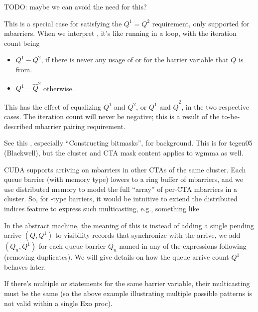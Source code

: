 \filbreak
{}

TODO: maybe we can avoid the need for this?

This is a special case for satisfying the $Q^1 = Q^2$ requirement, only supported for mbarriers.
When we interpret , it's like running
 in a loop, with the iteration count being
\begin{itemize}
  \item $Q^1 - Q^2$, if there is never any usage of  or  for the barrier variable that $Q$ is from.
  \item $Q^1 - \widehat{Q}^2$ otherwise.
\end{itemize}
This has the effect of equalizing $Q^1$ and $Q^2$, or $Q^1$ and $\widehat{Q}^2$, in the two respective cases.
The iteration count will never be negative; this is a result of the to-be-described mbarrier pairing requirement.

\newpage
{}
\label{ch:Multicasting}

See this , especially ``Constructing bitmasks'', for background.
This is for tcgen05 (Blackwell), but the cluster and CTA mask content applies to wgmma as well.

\filbreak
CUDA supports arriving on mbarriers in other CTAs of the same cluster.
Each queue barrier (with  memory type) lowers to a ring buffer of mbarriers, and we use distributed memory to model the full ``array'' of per-CTA mbarriers in a cluster.
So, for -type barriers, it would be intuitive to extend the distributed indices feature to express such multicasting, e.g., something like

\filbreak


\filbreak
In the abstract machine, the meaning of this is instead of adding a single pending arrive $(Q, Q^1)$ to visibility records that synchronize-with the arrive, we add $(Q_n, Q^1)$ for each queue barrier $Q_n$ named in any of the expressions following \lighttt{>>} (removing duplicates).
We will give details on how the queue arrive count $Q^1$ behaves later.

\filbreak
If there's multiple  or  statements for the same barrier variable, their multicasting must be the same (so the above example illustrating multiple possible patterns is not valid within a single Exo proc).

